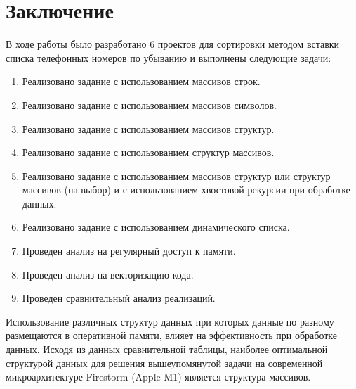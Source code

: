 \documentclass[a4paper,14pt]{article}
\begin{document}
\section{Заключение}
В ходе работы было разработано 6 проектов для сортировки методом вставки списка телефонных номеров по убыванию и выполнены следующие задачи:
\begin{enumerate}
    \item Реализовано задание с использованием массивов строк.
    \item Реализовано задание с использованием массивов символов.
    \item Реализовано задание с использованием массивов структур.
    \item Реализовано задание с использованием структур массивов.
    \item Реализовано задание с использованием массивов структур или структур массивов (на выбор) и с использованием хвостовой рекурсии при обработке данных.
    \item Реализовано задание с использованием динамического списка.
    \item Проведен анализ на регулярный доступ к памяти.
    \item Проведен анализ на векторизацию кода.
    \item Проведен сравнительный анализ реализаций.
\end{enumerate}

Использование различных структур данных при которых данные по разному размещаются в оперативной памяти, влияет на эффективность при обработке данных. Исходя из данных сравнительной таблицы, наиболее оптимальной структурой данных для решения вышеупомянутой задачи на современной микроархитектуре Firestorm (Apple M1) является структура массивов.
\end{document}
